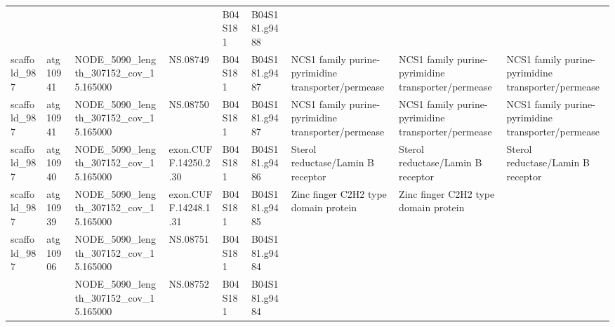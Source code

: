 \begin{longtable}{lllllllll}
                &           &                                         &                       &      B04S181 &   B04S181.g9488 &                                                                                 &                                                                                 &                                                                                 \\
   scaffold\_987 &  atg10941 &   NODE\_5090\_length\_307152\_cov\_15.165000 &              NS.08749 &      B04S181 &   B04S181.g9487 &                              NCS1 family purine-pyrimidine transporter/permease &                              NCS1 family purine-pyrimidine transporter/permease &                              NCS1 family purine-pyrimidine transporter/permease \\
   scaffold\_987 &  atg10941 &   NODE\_5090\_length\_307152\_cov\_15.165000 &              NS.08750 &      B04S181 &   B04S181.g9487 &                              NCS1 family purine-pyrimidine transporter/permease &                              NCS1 family purine-pyrimidine transporter/permease &                              NCS1 family purine-pyrimidine transporter/permease \\
   scaffold\_987 &  atg10940 &   NODE\_5090\_length\_307152\_cov\_15.165000 &  exon.CUFF.14250.2.30 &      B04S181 &   B04S181.g9486 &                                               Sterol reductase/Lamin B receptor &                                               Sterol reductase/Lamin B receptor &                                               Sterol reductase/Lamin B receptor \\
   scaffold\_987 &  atg10939 &   NODE\_5090\_length\_307152\_cov\_15.165000 &  exon.CUFF.14248.1.31 &      B04S181 &   B04S181.g9485 &                                            Zinc finger C2H2 type domain protein &                                            Zinc finger C2H2 type domain protein &                                                                                 \\
   scaffold\_987 &  atg10906 &   NODE\_5090\_length\_307152\_cov\_15.165000 &              NS.08751 &      B04S181 &   B04S181.g9484 &                                                                                 &                                                                                 &                                                                                 \\
                &           &   NODE\_5090\_length\_307152\_cov\_15.165000 &              NS.08752 &      B04S181 &   B04S181.g9484 &                                                                                 &                                                                                 &                                                                                 \\
\end{longtable}
